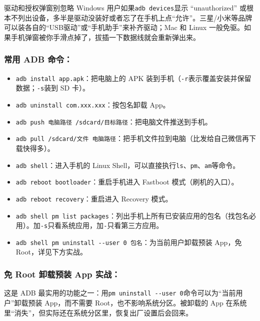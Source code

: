 \begin{tcbwarn}{驱动和授权弹窗别忽略}
Windows 用户如果\texttt{adb devices}显示 “unauthorized” 或根本不列出设备，多半是驱动没装好或者忘了在手机上点“允许”。三星/小米等品牌可以装各自的“USB驱动”或“手机助手”来补齐驱动；Mac 和 Linux 一般免驱。如果手机弹窗被你手滑点掉了，拔插一下数据线就会重新弹出来。

\end{tcbwarn}

\subsubsection*{常用 ADB 命令：}

\begin{itemize}
  \item \texttt{adb install app.\allowbreak apk}：把电脑上的 APK 装到手机（\texttt{-\allowbreak r}表示覆盖安装并保留数据；\texttt{-\allowbreak s}装到 SD 卡）。
  \item \texttt{adb uninstall com.\allowbreak xxx.\allowbreak xxx}：按包名卸载 App。
  \item \texttt{adb push 电脑路径 /\allowbreak sdcard/\allowbreak 目标路径}：把电脑文件推送到手机。
  \item \texttt{adb pull /\allowbreak sdcard/\allowbreak 文件 电脑路径}：把手机文件拉到电脑（比发给自己微信再下载快得多）。
  \item \texttt{adb shell}：进入手机的 Linux Shell，可以直接执行\texttt{ls}、\texttt{pm}、\texttt{am}等命令。
  \item \texttt{adb reboot bootloader}：重启手机进入 Fastboot 模式（刷机的入口）。
  \item \texttt{adb reboot recovery}：重启进入 Recovery 模式。
  \item \texttt{adb shell pm list packages}：列出手机上所有已安装应用的包名（找包名必用）。加\texttt{-\allowbreak s}只看系统应用，加\texttt{-}只看第三方应用。
  \item \texttt{adb shell pm uninstall -\allowbreak -\allowbreak user 0 包名}：为当前用户卸载预装 App，免 Root，详见下方实战。
\end{itemize}

\subsubsection*{免 Root 卸载预装 App 实战：}

这是 ADB 最实用的功能之一：用\texttt{pm uninstall -\allowbreak -\allowbreak user 0}命令可以为“当前用户”卸载预装 App，而不需要 Root，也不影响系统分区。被卸载的 App 在系统里“消失”，但实际还在系统分区里，恢复出厂设置后会回来。

